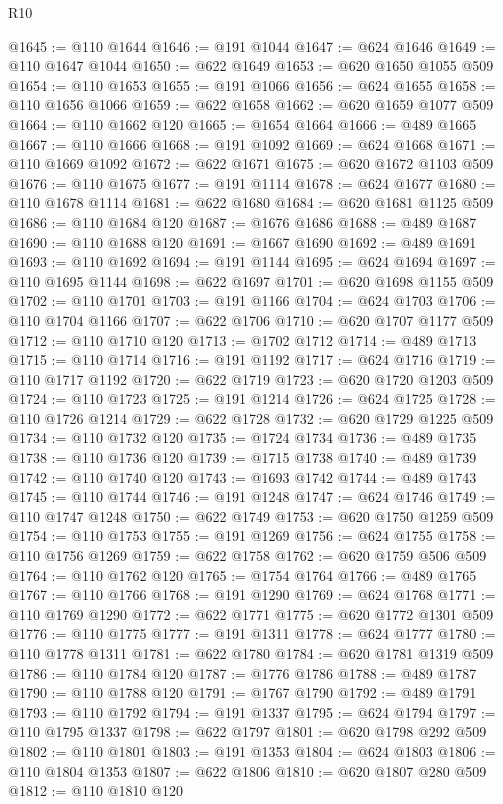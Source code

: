 \begin{lexlean}{R10}
\begin{coremodule}
@1645 := @110 @1644
@1646 := @191 @1044
@1647 := @624 @1646
@1649 := @110 @1647 @1044
@1650 := @622 @1649
@1653 := @620 @1650 @1055 @509
@1654 := @110 @1653
@1655 := @191 @1066
@1656 := @624 @1655
@1658 := @110 @1656 @1066
@1659 := @622 @1658
@1662 := @620 @1659 @1077 @509
@1664 := @110 @1662 @120
@1665 := @1654 @1664
@1666 := @489 @1665
@1667 := @110 @1666
@1668 := @191 @1092
@1669 := @624 @1668
@1671 := @110 @1669 @1092
@1672 := @622 @1671
@1675 := @620 @1672 @1103 @509
@1676 := @110 @1675
@1677 := @191 @1114
@1678 := @624 @1677
@1680 := @110 @1678 @1114
@1681 := @622 @1680
@1684 := @620 @1681 @1125 @509
@1686 := @110 @1684 @120
@1687 := @1676 @1686
@1688 := @489 @1687
@1690 := @110 @1688 @120
@1691 := @1667 @1690
@1692 := @489 @1691
@1693 := @110 @1692
@1694 := @191 @1144
@1695 := @624 @1694
@1697 := @110 @1695 @1144
@1698 := @622 @1697
@1701 := @620 @1698 @1155 @509
@1702 := @110 @1701
@1703 := @191 @1166
@1704 := @624 @1703
@1706 := @110 @1704 @1166
@1707 := @622 @1706
@1710 := @620 @1707 @1177 @509
@1712 := @110 @1710 @120
@1713 := @1702 @1712
@1714 := @489 @1713
@1715 := @110 @1714
@1716 := @191 @1192
@1717 := @624 @1716
@1719 := @110 @1717 @1192
@1720 := @622 @1719
@1723 := @620 @1720 @1203 @509
@1724 := @110 @1723
@1725 := @191 @1214
@1726 := @624 @1725
@1728 := @110 @1726 @1214
@1729 := @622 @1728
@1732 := @620 @1729 @1225 @509
@1734 := @110 @1732 @120
@1735 := @1724 @1734
@1736 := @489 @1735
@1738 := @110 @1736 @120
@1739 := @1715 @1738
@1740 := @489 @1739
@1742 := @110 @1740 @120
@1743 := @1693 @1742
@1744 := @489 @1743
@1745 := @110 @1744
@1746 := @191 @1248
@1747 := @624 @1746
@1749 := @110 @1747 @1248
@1750 := @622 @1749
@1753 := @620 @1750 @1259 @509
@1754 := @110 @1753
@1755 := @191 @1269
@1756 := @624 @1755
@1758 := @110 @1756 @1269
@1759 := @622 @1758
@1762 := @620 @1759 @506 @509
@1764 := @110 @1762 @120
@1765 := @1754 @1764
@1766 := @489 @1765
@1767 := @110 @1766
@1768 := @191 @1290
@1769 := @624 @1768
@1771 := @110 @1769 @1290
@1772 := @622 @1771
@1775 := @620 @1772 @1301 @509
@1776 := @110 @1775
@1777 := @191 @1311
@1778 := @624 @1777
@1780 := @110 @1778 @1311
@1781 := @622 @1780
@1784 := @620 @1781 @1319 @509
@1786 := @110 @1784 @120
@1787 := @1776 @1786
@1788 := @489 @1787
@1790 := @110 @1788 @120
@1791 := @1767 @1790
@1792 := @489 @1791
@1793 := @110 @1792
@1794 := @191 @1337
@1795 := @624 @1794
@1797 := @110 @1795 @1337
@1798 := @622 @1797
@1801 := @620 @1798 @292 @509
@1802 := @110 @1801
@1803 := @191 @1353
@1804 := @624 @1803
@1806 := @110 @1804 @1353
@1807 := @622 @1806
@1810 := @620 @1807 @280 @509
@1812 := @110 @1810 @120

\end{coremodule}
\end{lexlean}
